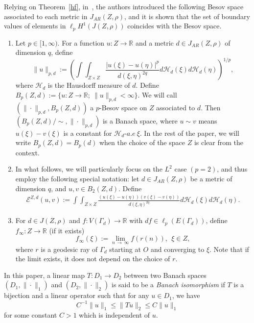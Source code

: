 \documentclass[AHL,Unicode,longabstracts,published]{cedram}
\newcommand{\ce}{\mathcal{E}}
\newcommand{\ch}{\mathcal{H}}
\newcommand{\br}{\mathbb{R}}
\begin{document}
Relying on Theorem~\ref{hf}, in~\cite{BP}, the authors introduced the following Besov space associated to each metric in $J_{AR}(Z,\rho)$, and it is shown that the set of boundary values of elements in $\ell_pH^1(J(Z,\rho))$ coincides with the Besov space.

\begin{defi}\label{def1}\leavevmode
\begin{enumerate}
\item\label{defi4.5.1} Let $p\in[1,\infty)$. For a function $u:Z\rightarrow\br$ and a metric $d\in J_{AR}(Z,\rho)$ of dimension $q$, define
\begin{equation*}
\|u\|_{p,d}:=\left(\int\int_{Z\times Z}\frac{|u(\xi)-u(\eta)|^p}{d(\xi,\eta)^{2q}}d\ch_{d}(\xi)d\ch_{d}(\eta)\right)^{1/p},
\end{equation*}
where $\ch_{d}$ is the Hausdorff measure of $d$. Define $B_p(Z,d):=\{u:Z\rightarrow\br;\ \|u\|_{p,d}<\infty\}$. We will call $(\|\cdot\|_{p,d},B_p(Z,d))$ a $p$-Besov space on $Z$ associated to $d$. Then $(B_p(Z,d)/\sim,\|\cdot\|_{p,d})$ is a Banach space, where $u\sim v$ means $u(\xi)-v(\xi)$ is a constant for $\ch_{d}$-$a.e\
\xi$. In the rest of the paper, we will write $B_p(Z,d)=B_p(d)$ when the choice of the space $Z$ is clear from the context.
\item\label{defi4.5.2} In what follows, we will particularly focus on the $L^2$ case $(p=2)$, and thus employ the following special notation: let $d\in J_{AR}(Z,\rho)$ be a metric of dimension $q$, and $u,v\in B_2(Z,d)$. Define
\begin{align*}
\ce^{Z,d}(u,v):=\int\int_{Z\times Z}\frac{(u(\xi)-u(\eta))(v(\xi)-v(\eta))}{d(\xi,\eta)^{2q}} d\ch_{d}(\xi)d\ch_{d}(\eta).
\end{align*}
\item\label{defi4.5.3} For $d\in J(Z,\rho)$ and $f:V(\Gamma_{d})
\rightarrow\br$ with $df\in\ell_p(E(\Gamma_{d}))$, define $f_{\infty}:Z\to\br$ (if it exists)
\begin{equation*}
f_{\infty}(\xi):=\lim_{n\,\to\,\infty}f(r(n)),\ \ \xi\in Z,
\end{equation*}
where $r$ is a geodesic ray of $\Gamma_{d}$ starting at $O$ and converging to $\xi$. Note that if the limit exists, it does not depend on the choice of $r$.
\end{enumerate}
\end{defi}

In this paper, a linear map $T:D_1\to D_2$ between two Banach spaces $(D_1,\|\cdot\|_1)$ and $(D_2,\|\cdot\|_2)$ is said to be a \emph{Banach isomorphism} if $T$ is a bijection and a linear operator such that for any $u\in D_1$, we have
\[
C^{-1}\|u\|_1\leq\|Tu\|_2\leq C\|u\|_1
\]
for some constant $C>1$ which is independent of $u$.
\end{document}
